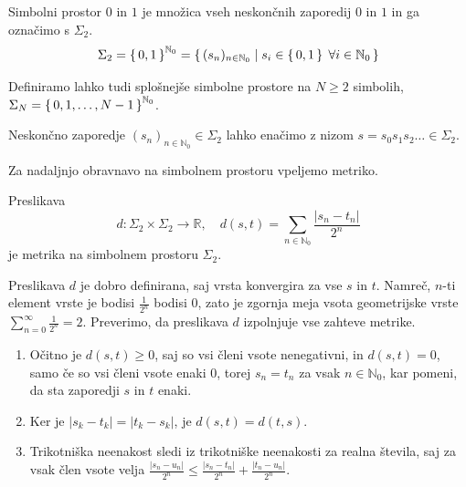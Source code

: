 \documentclass{isrmdelo}
\newcommand{\R}{\mathbb R}
\newcommand{\N}{\mathbb N}
\begin{document}
\begin{definicija}
Simbolni prostor $0$ in $1$ je množica vseh neskončnih zaporedij $0$ in $1$ in ga označimo s $\Sigma_2$.
\begin{equation*}
\Sigma_2 = \set{0,1}^{\N_0} = \set{ (s_n)_{n \in \N_0} \mid s_i \in \set{0,1} \; \forall i \in \N_0 }
\end{equation*}
\end{definicija}

\begin{opomba}
Definiramo lahko tudi splošnejše simbolne prostore na $N \geq 2$ simbolih, $\Sigma_N = \set{ 0, 1, \dots, N-1}^{\N_0}$.
\end{opomba}

\begin{opomba}
Neskončno zaporedje $(s_n)_{n \in \N_0} \in \Sigma_2$ lahko enačimo z nizom $s = s_0 s_1 s_2 \ldots \in \Sigma_2$.
\end{opomba}

\bigskip

Za nadaljnjo obravnavo na simbolnem prostoru vpeljemo metriko.

\begin{trditev}
Preslikava 
\begin{equation*}
d: \Sigma_2 \times \Sigma_2 \rightarrow \R, \quad d(s,t) = \sum_{n \in \N_0} \frac{\vert s_n - t_n \vert}{2^n}
\end{equation*}
je metrika na simbolnem prostoru $\Sigma_2$.
\end{trditev}

\begin{dokaz}
Preslikava $d$ je dobro definirana, saj vrsta konvergira za vse $s$ in $t$. Namreč, $n$-ti element vrste je bodisi $\frac{1}{2^n}$ bodisi $0$, zato je zgornja meja vsota geometrijske vrste $\sum_{n = 0}^{\infty} \frac{1}{2^n} = 2$. Preverimo, da preslikava $d$ izpolnjuje vse zahteve metrike.
\begin{enumerate}
    \item Očitno je $d(s,t) \geq 0$, saj so vsi členi vsote nenegativni, in $d(s,t) = 0$, samo če so vsi členi vsote enaki 0, torej $s_n = t_n$ za vsak $n \in \N_0$, kar pomeni, da sta zaporedji $s$ in $t$ enaki.
    \item Ker je $\vert s_k - t_k \vert = \vert t_k - s_k \vert$, je $d(s,t) = d(t,s)$.
    \item Trikotniška neenakost sledi iz trikotniške neenakosti za realna števila, saj za vsak člen vsote velja $\frac{\vert s_n - u_n \vert}{2^n} \leq \frac{\vert s_n - t_n \vert}{2^n} + \frac{\vert t_n - u_n \vert}{2^n}$. \qedhere
\end{enumerate}
\end{dokaz}
\end{document}
